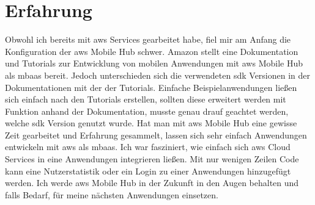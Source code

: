 \section{Erfahrung}
Obwohl ich bereits mit \gls{aws} Services gearbeitet habe, fiel mir  am Anfang die Konfiguration der \gls{aws} Mobile Hub schwer. Amazon stellt eine Dokumentation und Tutorials zur Entwicklung von mobilen Anwendungen mit \gls{aws} Mobile Hub als \gls{mbaas} bereit. Jedoch unterschieden sich die verwendeten \gls{sdk} Versionen in der Dokumentationen mit der der Tutorials. Einfache Beispielanwendungen ließen sich einfach nach den Tutorials erstellen, sollten diese erweitert werden mit Funktion anhand der Dokumentation, musste genau drauf geachtet werden, welche \gls{sdk} Version genutzt wurde. Hat man mit \gls{aws} Mobile Hub eine gewisse Zeit gearbeitet und Erfahrung gesammelt, lassen sich sehr einfach Anwendungen entwickeln mit \gls{aws} als \gls{mbaas}. Ich war fasziniert, wie einfach sich \gls{aws} Cloud Services in eine Anwendungen integrieren ließen. Mit nur wenigen Zeilen Code kann eine Nutzerstatistik oder ein Login zu einer Anwendungen hinzugefügt werden. Ich werde \gls{aws} Mobile Hub in der Zukunft in den Augen behalten und falls Bedarf, für meine nächsten Anwendungen einsetzen.